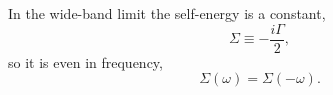 \documentclass{article}
\begin{document}
In the wide-band limit the self-energy is a constant,
\begin{equation}
\Sigma \equiv -\frac{i\Gamma}{2} ,
\label{eq:wb}
\end{equation}
so it is even in frequency,
\begin{equation}
\Sigma(\omega) = \Sigma(-\omega) .
\label{eq:even}
\end{equation}
\end{document}
